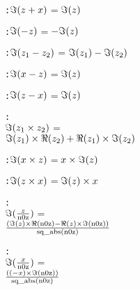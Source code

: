 \begin{alltt}
  :  \(\Imonefn{\opplustwofn{z}{x}}\) \(=\) \(\Imonefn{z}\)\vspace*{\pvsdeclspacing}

  :  \(\Imonefn{\opdifferenceonefn{z}}\) \(=\) \(\opdifferenceonefn{\Imonefn{z}}\)\vspace*{\pvsdeclspacing}

  :  \(\Imonefn{\opdifferencetwofn{z\sb{1}}{z\sb{2}}}\) \(=\) \(\opdifferencetwofn{\Imonefn{z\sb{1}}}{\Imonefn{z\sb{2}}}\)\vspace*{\pvsdeclspacing}

  :  \(\Imonefn{\opdifferencetwofn{x}{z}}\) \(=\) \(\Imonefn{z}\)\vspace*{\pvsdeclspacing}

  :  \(\Imonefn{\opdifferencetwofn{z}{x}}\) \(=\) \(\Imonefn{z}\)\vspace*{\pvsdeclspacing}

  : 
    \(\Imonefn{\optimestwofn{z\sb{1}}{z\sb{2}}}\) \(=\)
     \(\opplustwofn{\optimestwofn{\Imonefn{z\sb{1}}}{\Reonefn{z\sb{2}}}}{\optimestwofn{\Reonefn{z\sb{1}}}{\Imonefn{z\sb{2}}}}\)\vspace*{\pvsdeclspacing}

  :  \(\Imonefn{\optimestwofn{x}{z}}\) \(=\) \(\optimestwofn{x}{\Imonefn{z}}\)\vspace*{\pvsdeclspacing}

  :  \(\Imonefn{\optimestwofn{z}{x}}\) \(=\) \(\optimestwofn{\Imonefn{z}}{x}\)\vspace*{\pvsdeclspacing}

  : 
    \(\Imonefn{\opdividetwofn{z}{\pvsid{n0z}}}\) \(=\)
     \(\opdividetwofn{\pvsid{(}\opdifferencetwofn{\optimestwofn{\Imonefn{z}}{\Reonefn{\pvsid{n0z}}}}{\optimestwofn{\Reonefn{z}}{\Imonefn{\pvsid{n0z}}}}\pvsid{)}}{\pvsid{sq\_abs}\pvsid{(}\pvsid{n0z}\pvsid{)}}\)\vspace*{\pvsdeclspacing}

  : 
    \(\Imonefn{\opdividetwofn{x}{\pvsid{n0z}}}\) \(=\)
     \(\opdividetwofn{\pvsid{(}\optimestwofn{\pvsid{(}\opdifferenceonefn{x}\pvsid{)}}{\Imonefn{\pvsid{n0z}}}\pvsid{)}}{\pvsid{sq\_abs}\pvsid{(}\pvsid{n0z}\pvsid{)}}\)\vspace*{\pvsdeclspacing}


\end{alltt}
